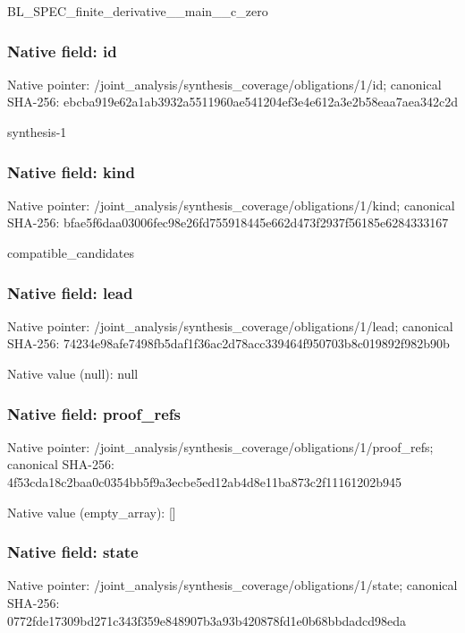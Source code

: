 \documentclass[10pt,a4paper]{article}
\begin{document}
\begingroup\raggedright\sloppy BL\_\allowbreak{}SPEC\_\allowbreak{}finite\_\allowbreak{}derivative\_\allowbreak{}\_\allowbreak{}main\_\allowbreak{}\_\allowbreak{}c\_\allowbreak{}zero\par\endgroup

\subsubsection{Native field: id}
Native pointer: /joint\_\allowbreak{}analysis/synthesis\_\allowbreak{}coverage/obligations/1/id; canonical SHA-256: ebcba919e62a1ab3932a5511960ae541204ef3e4e612a3e2b58eaa7aea342c2d

\begingroup\raggedright\sloppy synthesis-1\par\endgroup

\subsubsection{Native field: kind}
Native pointer: /joint\_\allowbreak{}analysis/synthesis\_\allowbreak{}coverage/obligations/1/kind; canonical SHA-256: bfae5f6daa03006fec98e26fd755918445e662d473f2937f56185e6284333167

\begingroup\raggedright\sloppy compatible\_\allowbreak{}candidates\par\endgroup

\subsubsection{Native field: lead}
Native pointer: /joint\_\allowbreak{}analysis/synthesis\_\allowbreak{}coverage/obligations/1/lead; canonical SHA-256: 74234e98afe7498fb5daf1f36ac2d78acc339464f950703b8c019892f982b90b

Native value (null): null

\subsubsection{Native field: proof\_\allowbreak{}refs}
Native pointer: /joint\_\allowbreak{}analysis/synthesis\_\allowbreak{}coverage/obligations/1/proof\_\allowbreak{}refs; canonical SHA-256: 4f53cda18c2baa0c0354bb5f9a3ecbe5ed12ab4d8e11ba873c2f11161202b945

Native value (empty\_\allowbreak{}array): []

\subsubsection{Native field: state}
Native pointer: /joint\_\allowbreak{}analysis/synthesis\_\allowbreak{}coverage/obligations/1/state; canonical SHA-256: 0772fde17309bd271c343f359e848907b3a93b420878fd1e0b68bbdadcd98eda
\end{document}
